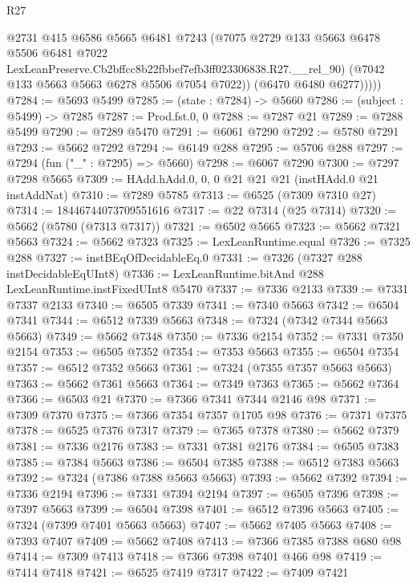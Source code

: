 \begin{lexlean}{R27}
\begin{coremodule}
              @2731
              @415
              @6586
              @5665
              @6481
              @7243
              (@7075
                @2729
                @133
                @5663
                @6478
                @5506
                @6481
                @7022
                LexLeanPreserve.Cb2bffcc8b22fbbef7efb3ff023306838.R27.__rel_90)
              (@7042 @133 @5663 @5663 @6278 @5506 @7054 @7022))
            (@6470 @6480 @6277)))))
@7284 := @5693 @5499
@7285 := (state : @7284) -> @5660
@7286 := (subject : @5499) -> @7285
@7287 := Prod.fst.{0, 0}
@7288 := @7287 @21
@7289 := @7288 @5499
@7290 := @7289 @5470
@7291 := @6061 @7290
@7292 := @5780 @7291
@7293 := @5662 @7292
@7294 := @6149 @288
@7295 := @5706 @288
@7297 := @7294 (fun ("_" : @7295) => @5660)
@7298 := @6067 @7290
@7300 := @7297 @7298 @5665
@7309 := HAdd.hAdd.{0, 0, 0} @21 @21 @21 (instHAdd.{0} @21 instAddNat)
@7310 := @7289 @5785
@7313 := @6525 (@7309 @7310 @27)
@7314 := 18446744073709551616
@7317 := @22 @7314 (@25 @7314)
@7320 := @5662 (@5780 (@7313 @7317))
@7321 := @6502 @5665
@7323 := @5662 @7321 @5663
@7324 := @5662 @7323
@7325 := LexLeanRuntime.equal
@7326 := @7325 @288
@7327 := instBEqOfDecidableEq.{0}
@7331 := @7326 (@7327 @288 instDecidableEqUInt8)
@7336 := LexLeanRuntime.bitAnd @288 LexLeanRuntime.instFixedUInt8 @5470
@7337 := @7336 @2133
@7339 := @7331 @7337 @2133
@7340 := @6505 @7339
@7341 := @7340 @5663
@7342 := @6504 @7341
@7344 := @6512 @7339 @5663
@7348 := @7324 (@7342 @7344 @5663 @5663)
@7349 := @5662 @7348
@7350 := @7336 @2154
@7352 := @7331 @7350 @2154
@7353 := @6505 @7352
@7354 := @7353 @5663
@7355 := @6504 @7354
@7357 := @6512 @7352 @5663
@7361 := @7324 (@7355 @7357 @5663 @5663)
@7363 := @5662 @7361 @5663
@7364 := @7349 @7363
@7365 := @5662 @7364
@7366 := @6503 @21
@7370 := @7366 @7341 @7344 @2146 @98
@7371 := @7309 @7370
@7375 := @7366 @7354 @7357 @1705 @98
@7376 := @7371 @7375
@7378 := @6525 @7376 @7317
@7379 := @7365 @7378
@7380 := @5662 @7379
@7381 := @7336 @2176
@7383 := @7331 @7381 @2176
@7384 := @6505 @7383
@7385 := @7384 @5663
@7386 := @6504 @7385
@7388 := @6512 @7383 @5663
@7392 := @7324 (@7386 @7388 @5663 @5663)
@7393 := @5662 @7392
@7394 := @7336 @2194
@7396 := @7331 @7394 @2194
@7397 := @6505 @7396
@7398 := @7397 @5663
@7399 := @6504 @7398
@7401 := @6512 @7396 @5663
@7405 := @7324 (@7399 @7401 @5663 @5663)
@7407 := @5662 @7405 @5663
@7408 := @7393 @7407
@7409 := @5662 @7408
@7413 := @7366 @7385 @7388 @680 @98
@7414 := @7309 @7413
@7418 := @7366 @7398 @7401 @466 @98
@7419 := @7414 @7418
@7421 := @6525 @7419 @7317
@7422 := @7409 @7421

\end{coremodule}
\end{lexlean}
